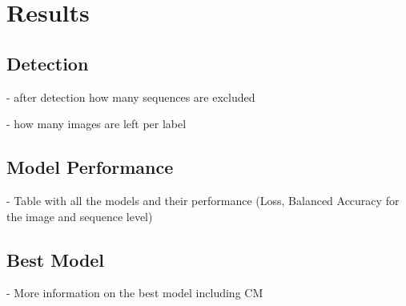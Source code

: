 

\section{Results}
\label{results}

    \subsection{Detection}

    - after detection how many sequences are excluded

    - how many images are left per label

    \subsection{Model Performance}

    - Table with all the models and their performance (Loss, Balanced Accuracy for the image and sequence level)

    \subsection{Best Model}

    - More information on the best model including CM
